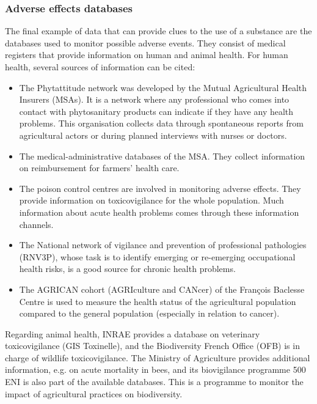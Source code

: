 
\subsubsection{Adverse effects databases}

The final example of data that can provide clues to the use of a substance are the databases used to monitor possible adverse events. They consist of medical registers that provide information on human and animal health. 
For human health, several sources of information can be cited: 
\begin{itemize}
\item The Phytattitude network was developed by the Mutual Agricultural Health Insurers (MSAs). It is a network where any professional who comes into contact with phytosanitary products can indicate if they have any health problems. This organisation collects data through spontaneous reports from agricultural actors or during planned interviews with nurses or doctors.
\item The medical-administrative databases of the MSA. They collect information on reimbursement for farmers' health care.
\item The poison control centres are involved in monitoring adverse effects. They provide information on toxicovigilance for the whole population. Much information about acute health problems comes through these information channels.
\item The National network of vigilance and prevention of professional pathologies (RNV3P), whose task is to identify emerging or re-emerging occupational health risks, is a good source for chronic health problems.
\item The AGRICAN cohort (AGRIculture and CANcer) of the François Baclesse Centre is used to measure the health status of the agricultural population compared to the general population (especially in relation to cancer).
\end{itemize}

Regarding animal health, INRAE provides a database on veterinary toxicovigilance (GIS Toxinelle), and the Biodiversity French Office (OFB) is in charge of wildlife toxicovigilance. The Ministry of Agriculture provides additional information, e.g. on acute mortality in bees, and its biovigilance programme 500 ENI is also part of the available databases. This is a programme to monitor the impact of agricultural practices on biodiversity.

